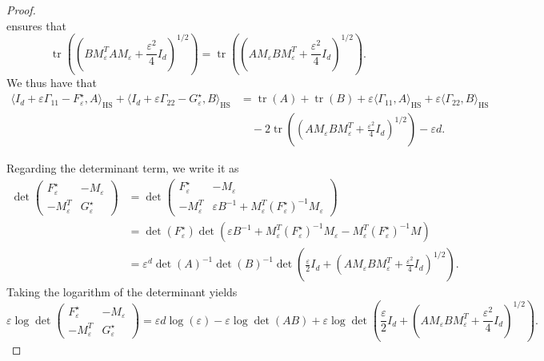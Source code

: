 \documentclass[]{article}
\DeclareMathOperator{\tr}{tr}
\DeclareMathOperator{\HS}{HS}
\numberwithin{equation}{section}
\theoremstyle{plain}
\begin{document}
{\begin{proof}
\begin{equation*}
	\end{equation*}
	ensures that 
	\begin{equation*}
		\tr\left(\left(BM_{\varepsilon}^T AM_{\varepsilon}+ \frac{\varepsilon^2}{4}I_d \right)^{1/2} \right) = \tr\left(\left(AM_{\varepsilon}BM_{\varepsilon}^T+ \frac{\varepsilon^2}{4}I_d \right)^{1/2} \right).
	\end{equation*}
	We thus have that 
	\begin{align*}
		\langle I_d+\varepsilon \Gamma_{11} - F_{\varepsilon}^\star, A \rangle_{\HS} + \langle I_d + \varepsilon \Gamma_{22} - G_\varepsilon^{\star}, B \rangle_{\HS} & = \tr(A) + \tr(B) +\varepsilon \langle \Gamma_{11}, A \rangle_{\HS}  +\varepsilon \langle \Gamma_{22}, B \rangle_{\HS} \\
		&\quad  - 2 \tr\left( \left(AM_{\varepsilon}BM_{\varepsilon}^T+ \frac{\varepsilon^2}{4}I_d \right)^{1/2} \right) - \varepsilon d.
	\end{align*}
	
	
	Regarding the determinant term, we write it as 
	\begin{align*}
		\det \begin{pmatrix}
			F_\varepsilon^\star   & -M_{\varepsilon}    \\
			-M_{\varepsilon}^T&    G_\varepsilon^\star
		\end{pmatrix}& =  \det \begin{pmatrix}
			F_\varepsilon^\star  & -M_{\varepsilon}    \\
			-M_{\varepsilon}^T&    \varepsilon B^{-1}+ M_\varepsilon^{T}(F_\varepsilon^{\star})^{-1}M_\varepsilon
		\end{pmatrix} \\
		& = \det ( F_\varepsilon^{\star}) \det(\varepsilon B^{-1}+ M_\varepsilon^{T}(F_\varepsilon^{\star})^{-1}M_{\varepsilon}- M_\varepsilon^{T}(F_\varepsilon^{\star})^{-1}M) \\
		& = \varepsilon^d\det(A)^{-1}\det(B)^{-1} \det\left( \frac{\varepsilon}{2}I_d + \left(AM_{\varepsilon}BM_{\varepsilon}^T+ \frac{\varepsilon^2}{4}I_d \right)^{1/2} \right).
	\end{align*}
	Taking the logarithm of the determinant yields
	\begin{equation*}
		\varepsilon\log \det\begin{pmatrix}
			F_\varepsilon^\star   & -M_{\varepsilon}    \\
			-M_{\varepsilon}^T&    G_\varepsilon^\star
		\end{pmatrix} =  \varepsilon d \log(\varepsilon) - \varepsilon\log \det(AB) + \varepsilon \log \det\left( \frac{\varepsilon}{2}I_d + \left(AM_{\varepsilon}BM_{\varepsilon}^T+ \frac{\varepsilon^2}{4}I_d \right)^{1/2} \right).
	\end{equation*}
	

\end{proof}}
\end{document}
